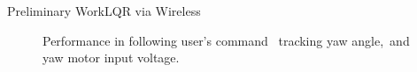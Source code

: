 \documentclass{beamer}
\begin{document}
\begin{frame}{Preliminary Work}{LQR via Wireless}
    \begin{figure}
      \centering
      \caption{Performance in following user's command~ tracking yaw angle,~and~ yaw motor input voltage.}
      \label{fig:performanceYawConst}
    \end{figure}
\end{frame}
\end{document}
